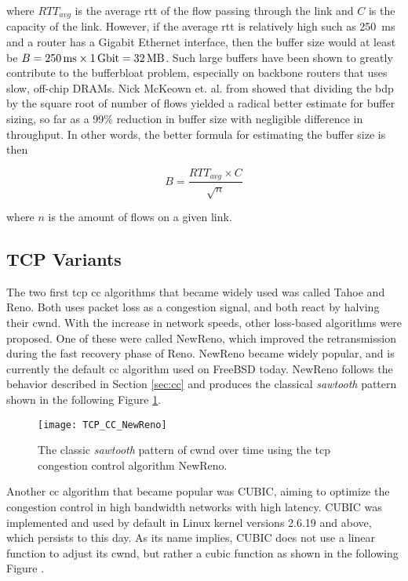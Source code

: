 where $RTT_{avg}$ is the average \gls{rtt} of the flow passing through the link and $C$ is the capacity of the link. However, if the average \gls{rtt} is relatively high such as \SI{250}{ms} and a router has a Gigabit Ethernet interface, then the buffer size would at least be $B = \SI{250}{\milli\second} \times \SI{1}{\giga\bit} = \SI{32}{\mega\byte}$. Such large buffers have been shown to greatly contribute to the bufferbloat problem, especially on backbone routers that uses slow, off-chip DRAMs. Nick McKeown et. al. from \cite{sizing_router_buffers} showed that dividing the \gls{bdp} by the square root of number of flows yielded a radical better estimate for buffer sizing, so far as a 99\% reduction in buffer size with negligible difference in throughput. In other words, the better formula for estimating the buffer size is then

\begin{equation}
    B = \frac{RTT_{avg} \times C}{\sqrt{n}}
\end{equation}

where $n$ is the amount of flows on a given link.




\subsection{TCP Variants}

The two first \gls{tcp} \gls{cc} algorithms that became widely used was called Tahoe and Reno. Both uses packet loss as a congestion signal, and both react by halving their \gls{cwnd}. With the increase in network speeds, other loss-based algorithms were proposed. One of these were called NewReno, which improved the retransmission during the fast recovery phase of Reno. NewReno became widely popular, and is currently the default \gls{cc} algorithm used on FreeBSD today. NewReno follows the behavior described in Section \ref{sec:cc} and produces the classical \textit{sawtooth} pattern shown in the following Figure \ref{fig:newreno}.

\begin{figure}[H]
    \centering
    \texttt{[image: TCP\_CC\_NewReno]}
    \captionsetup{width=0.75\linewidth}
    \caption{The classic \textit{sawtooth} pattern of \gls{cwnd} over time using the \gls{tcp} congestion control algorithm NewReno. }
    \label{fig:newreno}
\end{figure}

Another \gls{cc} algorithm that became popular was CUBIC, aiming to optimize the congestion control in high bandwidth networks with high latency. CUBIC was implemented and used by default in Linux kernel versions 2.6.19 and above, which persists to this day. As its name implies, CUBIC does not use a linear function to adjust its \gls{cwnd}, but rather a cubic function as shown in the following Figure .

